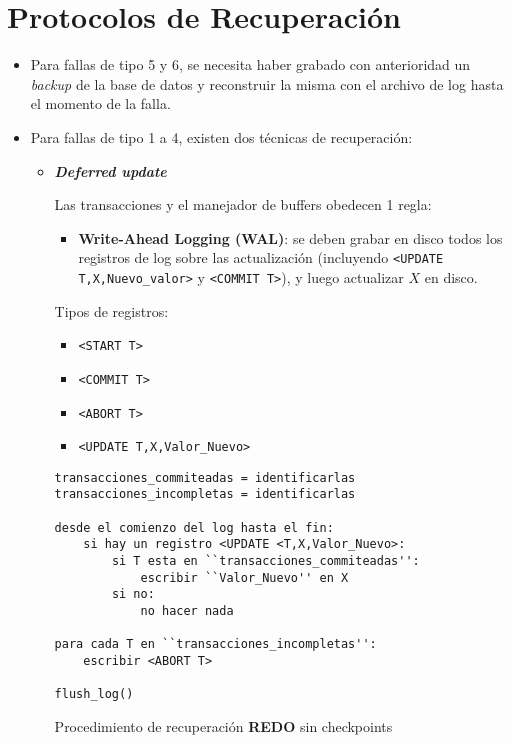 \documentclass[a4paper, twoside]{article}
\begin{document}
\section{Protocolos de Recuperación}
\begin{itemize}
\item Para fallas de tipo 5 y 6, se necesita haber grabado con anterioridad
un \emph{backup} de la base de datos y reconstruir la misma con el
archivo de log hasta el momento de la falla.
\item Para fallas de tipo 1 a 4, existen dos técnicas de recuperación:

\begin{itemize}
\item \textbf{\emph{Deferred update}}


Las transacciones y el manejador de buffers obedecen 1 regla:
\begin{itemize}
\item \textbf{Write-Ahead Logging (WAL)}:\textbf{ }se deben grabar en disco
todos los registros de log sobre las actualización (incluyendo \texttt{<UPDATE
T,X,Nuevo\_valor>} y \texttt{<COMMIT T>}), y luego actualizar $X$
en disco.
\end{itemize}

Tipos de registros:
\begin{itemize}
\item \texttt{<START T>}
\item \texttt{<COMMIT T>}
\item \texttt{<ABORT T>}
\item \texttt{<UPDATE T,X,Valor\_Nuevo>}
\end{itemize}

\begin{algorithm}[H]
\begin{lstlisting}
transacciones_commiteadas = identificarlas
transacciones_incompletas = identificarlas

desde el comienzo del log hasta el fin:
	si hay un registro <UPDATE <T,X,Valor_Nuevo>:
		si T esta en ``transacciones_commiteadas'':
			escribir ``Valor_Nuevo'' en X
		si no:
			no hacer nada

para cada T en ``transacciones_incompletas'':
	escribir <ABORT T>

flush_log()
\end{lstlisting}


\protect\caption{Procedimiento de recuperación \textbf{REDO }sin checkpoints}
\end{algorithm}




\end{itemize}
\end{itemize}
\end{document}
